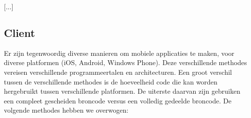[...]
    
\subsection{Client}
Er zijn tegenwoordig diverse manieren om mobiele applicaties te maken, voor diverse platformen (iOS, Android, Windows Phone). Deze verschillende methodes vereisen verschillende programmeertalen en architecturen. Een groot verschil tussen de verschillende methodes is de hoeveelheid code die kan worden hergebruikt tussen verschillende platformen. De uiterste daarvan zijn gebruiken een compleet gescheiden broncode versus een volledig gedeelde broncode. De volgende methodes hebben we overwogen:


